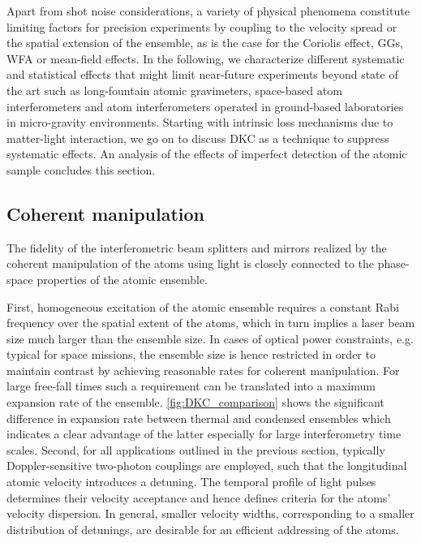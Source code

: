 %
%
Apart from shot noise considerations, a variety of physical phenomena constitute limiting factors for precision experiments by coupling to the velocity spread or the spatial extension of the ensemble, as is the case for the Coriolis effect, GGs, WFA or mean-field effects. In the following, we characterize different systematic and statistical effects that might limit near-future experiments beyond state of the art such as long-fountain atomic gravimeters, space-based atom interferometers and atom interferometers operated in ground-based laboratories in micro-gravity environments. Starting with intrinsic loss mechanisms due to matter-light interaction, we go on to discuss DKC as a technique to suppress sys\-te\-ma\-tic effects. An analysis of the effects of imperfect detection of the atomic sample concludes this section.
%
\subsection{Coherent manipulation}
The fidelity of the interferometric beam splitters and mirrors realized by the coherent manipulation of the atoms using light is closely connected to the phase-space properties of the atomic ensemble.

First, homogeneous excitation of the atomic ensemble requires a constant Rabi frequency over the spatial extent of the atoms, which in turn implies a laser beam size much larger than the ensemble size. 
In cases of optical power constraints, e.g. typical for space missions, the ensemble size is hence restricted in order to maintain contrast by achieving reasonable rates for coherent manipulation. 
For large free-fall times such a requirement can be translated into a maximum expansion rate of the ensemble. 
\autoref{fig:DKC_comparison} shows the significant difference in expansion rate between thermal and condensed ensembles which indicates a clear advantage of the latter especially for large interferometry time scales.
Second, for all applications outlined in the previous section, typically Doppler-sensitive two-photon couplings are employed, such that the longitudinal atomic velocity introduces a detuning. 
The temporal profile of light pulses determines their velocity acceptance and hence defines criteria for the atoms' velocity dispersion. 
In general, smaller velocity widths, corresponding to a smaller distribution of detunings, are desirable for an efficient addressing of the atoms.

